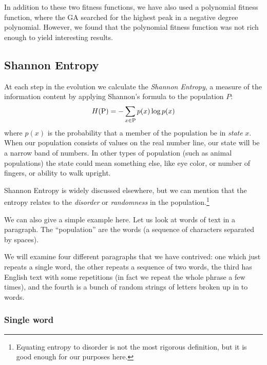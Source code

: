 \documentclass[11pt]{article}
\begin{document}
In addition to these two fitness functions, we have also used a
polynomial fitness function, where the GA searched for the highest
peak in a negative degree polynomial. However, we found that the
polynomial fitness function was not rich enough to yield interesting
results.



\subsection{Shannon Entropy}

At each step in the evolution we calculate the \emph{Shannon Entropy},
a measure of the information content by applying Shannon's formula to
the population $P$:
\begin{equation}
H({\rm P}) = -\sum_{x \in {\rm P}} p(x)\log p(x)
\label{eq:shannon-entropy-def}
\end{equation}
where $p(x)$ is the probability that a member of the population be in
\emph{state} $x$.  When our population consists of values on the real
number line, our state will be a narrow band of numbers.  In other
types of population (such as animal populations) the state could mean
something else, like eye color, or number of fingers, or ability to
walk upright.

Shannon Entropy is widely discussed elsewhere, but we can mention that
the entropy relates to the \emph{disorder} or \emph{randomness} in the
population.\footnote{Equating entropy to disorder is not the most
rigorous definition, but it is good enough for our purposes here.}

We can also give a simple example here.  Let us look at words of text
in a paragraph.  The ``population'' are the words (a sequence of
characters separated by spaces).

We will examine four different paragraphs that we have contrived: one
which just repeats a single word, the other repeats a sequence of two
words, the third has English text with some repetitions (in fact we
repeat the whole phrase a few times), and the fourth is a bunch of
random strings of letters broken up in to words.


\subsubsection{Single word}
\end{document}
